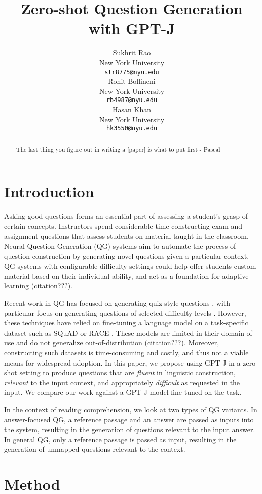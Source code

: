\documentclass[11pt]{article}
\title{Zero-shot Question Generation with GPT-J}
\author{Sukhrit Rao \\
  New York University \\
  \texttt{str8775@nyu.edu} \\\And
  Rohit Bollineni \\
  New York University \\
  \texttt{rb4987@nyu.edu} \\\And
  Hasan Khan \\
  New York University \\
  \texttt{hk3550@nyu.edu} \\}
\begin{document}
\maketitle
\begin{abstract}
The last thing you figure out in writing a [paper] is what to put first - Pascal
\end{abstract}

\section{Introduction}

Asking good questions forms an essential part of assessing a student’s grasp of certain concepts. Instructors spend considerable time constructing exam and assignment questions that assess students on material taught in the classroom. Neural Question Generation (QG) systems aim to automate the process of question construction by generating novel questions given a particular context. QG systems with configurable difficulty settings could help offer students custom material based on their individual ability, and act as a foundation for adaptive learning (citation???). 

Recent work in QG has focused on generating quiz-style questions \citep{Quiz:1}, with particular focus on generating questions of selected difficulty levels \citep{Difficulty:3}. However, these techniques have relied on fine-tuning a language model on a task-specific dataset such as SQuAD or RACE \citep{RACE:2}. These models are limited in their domain of use and do not generalize out-of-distribution (citation???). Moreover, constructing such datasets is time-consuming and costly, and thus not a viable means for widespread adoption. In this paper, we propose using GPT-J in a zero-shot setting to produce questions that are \textit{fluent} in linguistic construction, \textit{relevant} to the input context, and appropriately \textit{difficult} as requested in the input. We compare our work against a GPT-J model fine-tuned on the task.

In the context of reading comprehension, we look at two types of QG variants. In answer-focused QG, a reference passage and an answer are passed as inputs into the system, resulting in the generation of questions relevant to the input answer. In general QG, only a reference passage is passed as input, resulting in the generation of unmapped questions relevant to the context.

\section{Method}
\end{document}

